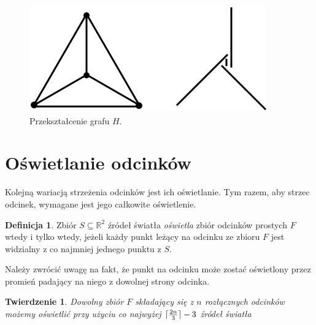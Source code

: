 \documentclass[brudnopis]{xmgr}
\DeclarePairedDelimiter\ceil{\lceil}{\rceil}
\newtheorem{Twierdzenie}{Twierdzenie}
\theoremstyle{definition}
\newtheorem{Definicja}{Definicja}
\begin{document}
\begin{figure}[ht!]
 \centering
  \includegraphics{rysunki/dolna_granica.png}
  \caption{Przekształcenie grafu $H$.}
  \label{fig:przeksztalcenie h}
\end{figure} 

\section{Oświetlanie odcinków}\label{oświetlanie odcinków}
Kolejną wariacją strzeżenia odcinków jest ich oświetlanie. Tym razem, aby strzec odcinek, wymagane jest jego całkowite oświetlenie.
\begin{Definicja}
	Zbiór $S \subseteq \mathbb{R}^2$ źródeł światła \emph{oświetla} zbiór odcinków prostych $F$ wtedy i tylko wtedy, jeżeli każdy punkt leżący na odcinku ze zbioru $F$ jest widzialny z co najmniej jednego punktu z $S$.
\end{Definicja} Należy zwrócić uwagę na fakt, że punkt na odcinku może zostać oświetlony przez promień padający na niego z dowolnej strony odcinka.

\begin{Twierdzenie} \cite{illumination}
 Dowolny zbiór $F$ składający się z $n$ rozłącznych odcinków możemy oświetlić przy użyciu co najwyżej $\ceil{\frac{2n}{3}} - 3$ źródeł światła
\end{Twierdzenie}
\end{document}
